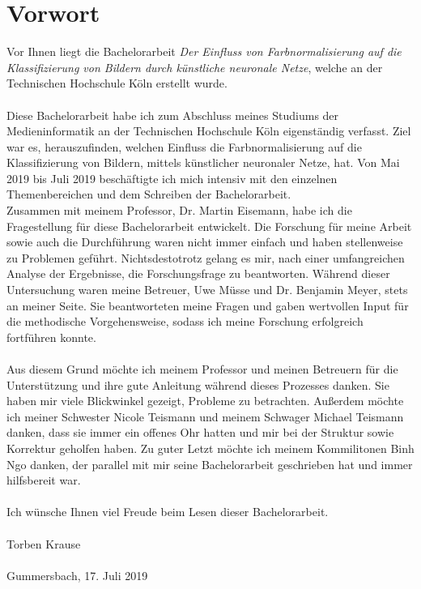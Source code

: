 \chapter*{Vorwort}
Vor Ihnen liegt die Bachelorarbeit \textit{Der Einfluss von Farbnormalisierung auf die Klassifizierung von Bildern durch künstliche neuronale Netze}, welche an der Technischen Hochschule Köln erstellt wurde.\\\\
Diese Bachelorarbeit habe ich zum Abschluss meines Studiums der Medieninformatik an der Technischen Hochschule Köln eigenständig verfasst. Ziel war es, herauszufinden, welchen Einfluss die Farbnormalisierung auf die Klassifizierung von Bildern, mittels künstlicher neuronaler Netze, hat. Von Mai 2019 bis Juli 2019 beschäftigte ich mich intensiv mit den einzelnen Themenbereichen und dem Schreiben der Bachelorarbeit.\\
Zusammen mit meinem Professor, Dr. Martin Eisemann, habe ich die Fragestellung für diese Bachelorarbeit entwickelt. Die Forschung für meine Arbeit sowie auch die Durchführung waren nicht immer einfach und haben stellenweise zu Problemen geführt. Nichtsdestotrotz gelang es mir, nach einer umfangreichen Analyse der Ergebnisse, die Forschungsfrage zu beantworten. Während dieser Untersuchung waren meine Betreuer, Uwe Müsse und Dr. Benjamin Meyer, stets an meiner Seite. Sie beantworteten meine Fragen und gaben wertvollen Input für die methodische Vorgehensweise, sodass ich meine Forschung erfolgreich fortführen konnte.\\\\
Aus diesem Grund möchte ich meinem Professor und meinen Betreuern für die Unterstützung und ihre gute Anleitung während dieses Prozesses danken. Sie haben mir viele Blickwinkel gezeigt, Probleme zu betrachten. Außerdem möchte ich meiner Schwester Nicole Teismann und meinem Schwager Michael Teismann danken, dass sie immer ein offenes Ohr hatten und mir bei der Struktur sowie Korrektur geholfen haben. Zu guter Letzt möchte ich meinem Kommilitonen Binh Ngo danken, der parallel mit mir seine Bachelorarbeit geschrieben hat und immer hilfsbereit war.\\\\
Ich wünsche Ihnen viel Freude beim Lesen dieser Bachelorarbeit.\\\\
Torben Krause\\\\
Gummersbach, 17. Juli 2019
